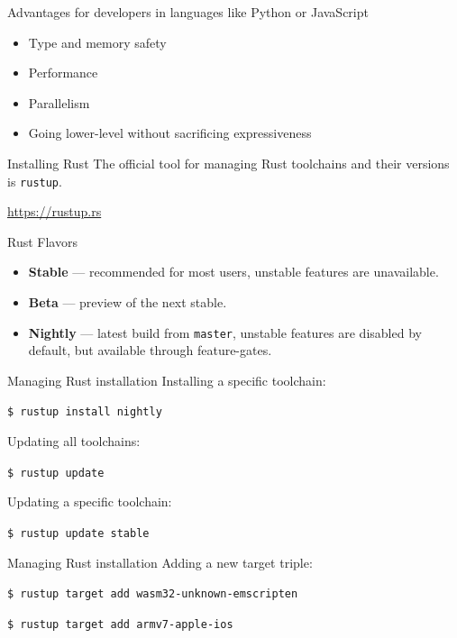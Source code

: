 \documentclass[12pt, aspectratio=169]{beamer}
\begin{document}
\begin{frame}{Advantages for developers in languages like Python or JavaScript}
  \begin{itemize}
    \item Type and memory safety
    \item Performance
    \item Parallelism
    \item Going lower-level without sacrificing expressiveness
  \end{itemize}
\end{frame}

\begin{frame}{Installing Rust}
  The official tool for managing Rust toolchains and their versions is
  \texttt{rustup}.

  \url{https://rustup.rs}
\end{frame}

\begin{frame}{Rust Flavors}
  \begin{itemize}
    \item \textbf{Stable} --- recommended for most users, unstable features are
      unavailable.
    \item \textbf{Beta} --- preview of the next stable.
    \item \textbf{Nightly} --- latest build from \texttt{master}, unstable
      features are disabled by default, but available through feature-gates.
  \end{itemize}
\end{frame}

\begin{frame}{Managing Rust installation}
  Installing a specific toolchain:

  \texttt{\$ rustup install nightly}

  Updating all toolchains:

  \texttt{\$ rustup update}

  Updating a specific toolchain:

  \texttt{\$ rustup update stable}
\end{frame}

\begin{frame}{Managing Rust installation}
  Adding a new target triple:

  \texttt{\$ rustup target add wasm32-unknown-emscripten}

  \texttt{\$ rustup target add armv7-apple-ios}
\end{frame}
\end{document}
